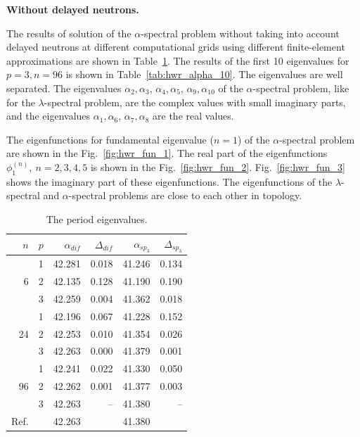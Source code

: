 \documentclass[authoryear]{elsarticle}
\begin{document}
\textbf{Without delayed neutrons.}

The results of solution of the $\alpha$-spectral problem without taking into account delayed neutrons at different computational grids using different finite-element approximations are shown in Table~\ref{tab:hwr_alpha}. 
The results of the first 10 eigenvalues for $p = 3, n = 96 $ is shown in Table~\ref{tab:hwr_alpha_10}.
The eigenvalues are well separated.
The eigenvalues $\alpha_2, \alpha_3$, $\alpha_4, \alpha_5$, $\alpha_9, \alpha_{10}$ of the $\alpha$-spectral problem, like for the $\lambda$-spectral problem, are the complex values with small imaginary parts, and the eigenvalues $\alpha_1, \alpha_6$, $\alpha_7, \alpha_8$ are the real values.

The eigenfunctions for fundamental eigenvalue ($n=1$) of the $\alpha$-spectral problem  are shown in the Fig.~\ref{fig:hwr_fun_1}.
The real part of the eigenfunctions $\phi^{(n)}_1, \ n = 2,3,4,5$ is shown in the Fig.~\ref{fig:hwr_fun_2}.
Fig.~\ref{fig:hwr_fun_3} shows the imaginary part of these eigenfunctions.
The eigenfunctions of the $\lambda$-spectral and $\alpha$-spectral problems are close to each other in topology.

\begin{table}[h]
\caption{The period eigenvalues.}
\label{tab:hwr_alpha}
\begin{center}
\begin{tabular}{rrrrrr}
\hline
$n$ & $p$ & $\alpha_{dif}$ & $\Delta_{dif}$ &$\alpha_{sp_3}$& $\Delta_{sp_3}$ \\
\hline
	& 1	&42.281 & 0.018 & 41.246 & 0.134\\
6	& 2	&42.135 & 0.128 & 41.190 & 0.190\\
	& 3	&42.259 & 0.004 & 41.362 & 0.018\\ 
\hline
	& 1	&42.196 & 0.067 & 41.228 & 0.152\\
24& 2	&42.253 & 0.010 & 41.354 & 0.026\\
	& 3	&42.263 & 0.000 & 41.379 & 0.001\\ 
\hline
	& 1	&42.241 & 0.022 & 41.330 & 0.050\\
96& 2	&42.262 & 0.001 & 41.377 & 0.003\\
	& 3	&42.263 &    -- & 41.380 & -- \\ 
\hline
Ref.& & 42.263 & & 41.380 \\ 
\hline
\end{tabular}
\end{center}
\end{table}
\end{document}
